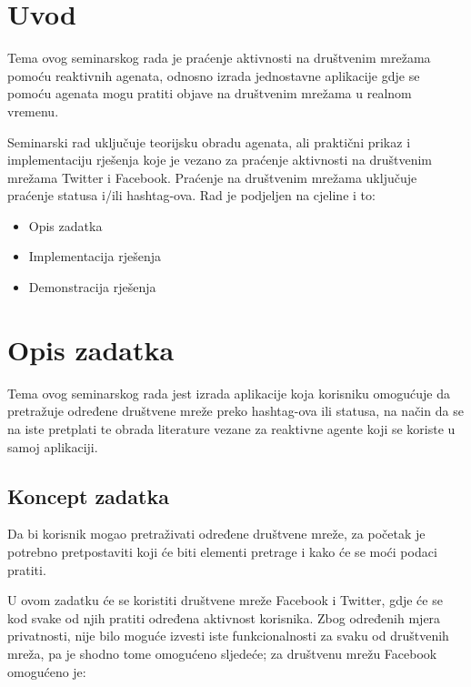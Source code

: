 \documentclass[a4paper,12pt]{foi}
\begin{document}
\maketitle

\tableofcontents

\thispagestyle{empty}

\setcounter{page}{0}

\onehalfspacing


\chapter{Uvod}

Tema ovog seminarskog rada je praćenje aktivnosti na društvenim mrežama pomoću reaktivnih agenata, odnosno izrada jednostavne aplikacije gdje se pomoću agenata mogu pratiti objave na društvenim mrežama u realnom vremenu.

Seminarski rad uključuje teorijsku obradu agenata, ali praktični prikaz i implementaciju rješenja koje je vezano za praćenje aktivnosti na društvenim mrežama Twitter i Facebook. Praćenje na društvenim mrežama uključuje praćenje statusa i/ili hashtag-ova. Rad je podjeljen na cjeline i to:

\begin{itemize}
\item{Opis zadatka}
\item{Implementacija rješenja}
\item{Demonstracija rješenja}
\end{itemize}


\chapter{Opis zadatka}

Tema ovog seminarskog rada jest izrada aplikacije koja korisniku omogućuje da pretražuje određene društvene mreže preko hashtag-ova ili statusa, na način da se na iste pretplati te obrada literature vezane za reaktivne agente koji se koriste u samoj aplikaciji.

\section{Koncept zadatka}
Da bi korisnik mogao pretraživati određene društvene mreže, za početak je potrebno pretpostaviti koji će biti elementi pretrage i kako će se moći podaci pratiti. 

U ovom zadatku će se koristiti društvene mreže Facebook i Twitter, gdje će se kod svake od njih pratiti određena aktivnost korisnika. Zbog određenih mjera privatnosti, nije bilo moguće izvesti iste funkcionalnosti za svaku od društvenih mreža, pa je shodno tome omogućeno sljedeće; za društvenu mrežu Facebook omogućeno je:
\end{document}
